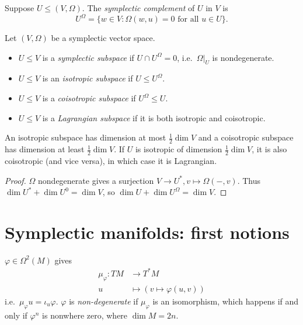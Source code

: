 \documentclass[a4paper]{article}
\begin{document}
\begin{definition}
  Suppose \(U \leq (V, \Omega)\). The \emph{symplectic complement} of \(U\) in \(V\) is
  \[
    U^{\Omega} = \{w \in V: \Omega(w, u) = 0 \text{ for all } u \in U\}.
  \]
\end{definition}

\begin{definition}
  Let \((V, \Omega)\) be a symplectic vector space.
  \begin{itemize}
  \item \(U \leq V\) is a \emph{symplectic subspace} if \(U \cap U^\Omega = 0\), i.e.\ \(\Omega|_U\) is nondegenerate.
  \item \(U \leq V\) is an \emph{isotropic subspace} if \(U \leq U^\Omega\).
  \item \(U \leq V\) is a \emph{coisotropic subspace} if \(U^\Omega \leq U\).
  \item \(U \leq V\) is a \emph{Lagrangian subspace} if it is both isotropic and coisotropic.
  \end{itemize}
\end{definition}

\begin{proposition}
  An isotropic subspace has dimension at most \(\frac{1}{2} \dim V\) and a coisotropic subspace has dimension at least \(\frac{1}{2} \dim V\). If \(U\) is isotropic of dimension \(\frac{1}{2} \dim V\), it is also coisotropic (and vice versa), in which case it is Lagrangian.
\end{proposition}

\begin{proof}
  \(\Omega\) nondegenerate gives a surjection \(V \to U^*, v \mapsto \Omega(-, v)\). Thus \(\dim U^* + \dim U^0 = \dim V\), so \(\dim U + \dim U^\Omega = \dim V\).
\end{proof}

\section{Symplectic manifolds: first notions}

\(\varphi \in \Omega^2(M)\) gives
\begin{align*}
  \mu_\varphi: TM &\to T^*M \\
  u &\mapsto (v \mapsto \varphi(u, v))
\end{align*}
i.e.\ \(\mu_\varphi u = \iota_u \varphi\). \(\varphi\) is \emph{non-degenerate} if \(\mu_\varphi\) is an isomorphism, which happens if and only if \(\varphi^n\) is nonwhere zero, where \(\dim M = 2n\).
\end{document}
